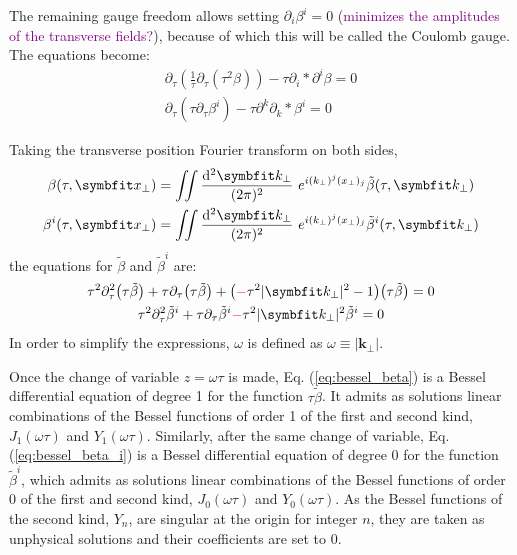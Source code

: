 The remaining gauge freedom allows setting $\partial_i \beta^i = 0$ (\textcolor{purple}{minimizes the amplitudes of the transverse fields?}), because of which this will be called the Coulomb gauge. The equations become:
\begin{subequations}
	\begin{gather}
		\partial_\tau \left( \frac{1}{\tau} \partial_\tau \left( \tau^2 \beta \right) \right) - \tau \partial_i * \partial^i \beta = 0 \\
		\partial_\tau \left( \tau \partial_\tau \beta^i \right) - \tau \partial^k \partial_k * \beta^i =0
	\end{gather}
\end{subequations}

Taking the transverse position Fourier transform on both sides,
\begin{subequations}
	\begin{gather}
		\beta (\tau, \mathbf{x}_\perp) = \iint \frac{\diff^2 \mathbf{k}_\perp}{(2\pi)^2} ~ e^{i (k_\perp)^j (x_\perp)_j} \tilde{\beta} (\tau, \mathbf{k}_\perp) \\
		\beta^i (\tau, \mathbf{x}_\perp) = \iint \frac{\diff^2 \mathbf{k}_\perp}{(2\pi)^2} ~ e^{i (k_\perp)^j (x_\perp)_j} \tilde{\beta}^i (\tau, \mathbf{k}_\perp)
	\end{gather}
\end{subequations}
the equations for $\tilde{\beta}$ and $\tilde{\beta}^i$ are:
\begin{subequations}
	\begin{gather}
		\tau^2 \partial_\tau^2 \big(\tau \tilde{\beta}\big) + \tau \partial_\tau \big(\tau \tilde{\beta}\big) + \big(\textcolor{red}{-}\tau^2 |\mathbf{k}_\perp|^2 - 1\big) \big(\tau \tilde{\beta}\big) = 0  \label{eq:bessel_beta}\\
		\tau^2 \partial_\tau^2 \tilde{\beta}^i + \tau \partial_\tau \tilde{\beta}^i \textcolor{red}{-} \tau^2 |\mathbf{k}_\perp|^2  \tilde{\beta}^i =0 \label{eq:bessel_beta_i}
	\end{gather}
\end{subequations}
In order to simplify the expressions, $\omega$ is defined as $\omega \equiv |\mathbf{k}_\perp| $.

Once the change of variable $z=\omega \tau$ is made, Eq. (\ref{eq:bessel_beta}) is a Bessel differential equation of degree 1 for the function $\tau \tilde{\beta}$. It admits as solutions linear combinations of the Bessel functions of order 1 of the first and second kind, $J_1(\omega \tau)$ and $Y_1(\omega \tau)$. Similarly, after the same change of variable, Eq. (\ref{eq:bessel_beta_i}) is a Bessel differential equation of degree 0 for the function $\tilde{\beta}^i$, which admits as solutions linear combinations of the Bessel functions of order 0 of the first and second kind, $J_0(\omega \tau)$ and $Y_0(\omega \tau)$. \cite{arfken2013} As the Bessel functions of the second kind, $Y_n$, are singular at the origin for integer $n$, they are taken as unphysical solutions and their coefficients are set to $0$.

